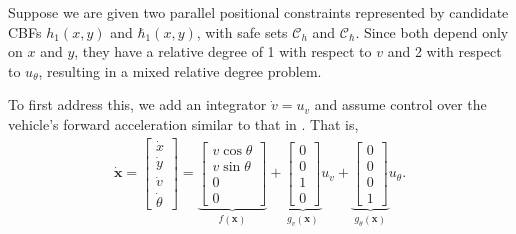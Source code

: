\documentclass[letterpaper, 10 pt, conference]{ieeeconf}
\begin{document}
Suppose we are given two parallel positional constraints represented by candidate CBFs $h_1(x,y)$ and $\hbar_1(x,y)$, with safe sets $\mathcal{C}_{h}$ and $\mathcal{C}_{\hbar}$. Since both depend only on $x$ and $y$, they have a relative degree of 1 with respect to $v$ and 2 with respect to $u_\theta$, resulting in a mixed relative degree problem.



To first address this, we add an integrator $\dot{v} = u_v$ and assume control over the vehicle's forward acceleration similar to that in \cite{kim2024robustcontrolbarrierfunction}. That is,
\begin{align}\label{uni_sys}
    \dot{\mathbf{x}}
    =
    \begin{bmatrix}
        \dot{x}\\
        \dot{y}\\
        \dot{v}\\
        \dot{\theta}
    \end{bmatrix}
    =
    \underbrace{
    \begin{bmatrix}
        v\cos\theta\\
        v\sin\theta\\
        0\\
        0
    \end{bmatrix}}_{f(\mathbf{x})}
    +
    \underbrace{
    \begin{bmatrix}
        0\\
        0\\
        1\\
        0
    \end{bmatrix}}_{g_v(\mathbf{x})}u_v
    +
    \underbrace{
    \begin{bmatrix}
        0\\
        0\\
        0\\
        1
    \end{bmatrix}}_{g_\theta(\mathbf{x})}u_\theta.
\end{align}
\end{document}
